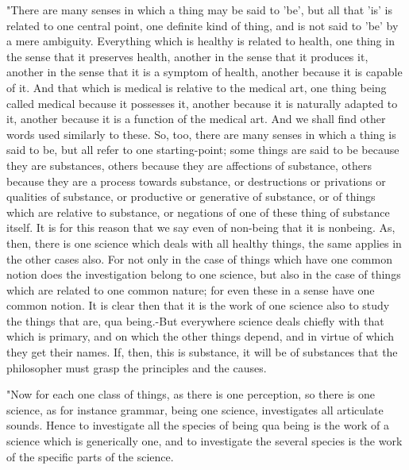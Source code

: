 "There are many senses in which a thing may be said to 'be', but all
that 'is' is related to one central point, one definite kind of thing,
and is not said to 'be' by a mere ambiguity. Everything which is healthy
is related to health, one thing in the sense that it preserves health,
another in the sense that it produces it, another in the sense that
it is a symptom of health, another because it is capable of it. And
that which is medical is relative to the medical art, one thing being
called medical because it possesses it, another because it is naturally
adapted to it, another because it is a function of the medical art.
And we shall find other words used similarly to these. So, too, there
are many senses in which a thing is said to be, but all refer to one
starting-point; some things are said to be because they are substances,
others because they are affections of substance, others because they
are a process towards substance, or destructions or privations or
qualities of substance, or productive or generative of substance,
or of things which are relative to substance, or negations of one
of these thing of substance itself. It is for this reason that we
say even of non-being that it is nonbeing. As, then, there is one
science which deals with all healthy things, the same applies in the
other cases also. For not only in the case of things which have one
common notion does the investigation belong to one science, but also
in the case of things which are related to one common nature; for
even these in a sense have one common notion. It is clear then that
it is the work of one science also to study the things that are, qua
being.-But everywhere science deals chiefly with that which is primary,
and on which the other things depend, and in virtue of which they
get their names. If, then, this is substance, it will be of substances
that the philosopher must grasp the principles and the causes.

"Now for each one class of things, as there is one perception, so
there is one science, as for instance grammar, being one science,
investigates all articulate sounds. Hence to investigate all the species
of being qua being is the work of a science which is generically one,
and to investigate the several species is the work of the specific
parts of the science. 

